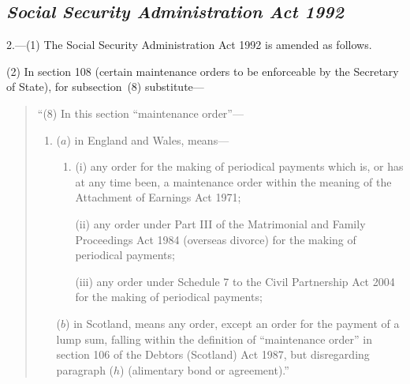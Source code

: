 \documentclass[12pt,a4paper]{article}
\begin{document}
\subsection*{\itshape Social Security Administration Act 1992}

2.---(1) The Social Security Administration Act 1992 is amended as follows.

(2) In section 108 (certain maintenance orders to be enforceable by the Secretary of State), for subsection~(8) substitute—
\begin{quotation}
“(8) In this section “maintenance order”—
\begin{enumerate}\item[]
($a$) in England and Wales, means—
\begin{enumerate}\item[]
(i) any order for the making of periodical payments which is, or has at any time been, a maintenance order within the meaning of the Attachment of Earnings Act 1971;

(ii) any order under Part III of the Matrimonial and Family Proceedings Act 1984 (overseas divorce) for the making of periodical payments;

(iii) any order under Schedule 7 to the Civil Partnership Act 2004 for the making of periodical payments;
\end{enumerate}

($b$) in Scotland, means any order, except an order for the payment of a lump sum, falling within the definition of “maintenance order” in section 106 of the Debtors (Scotland) Act 1987, but disregarding paragraph ($h$) (alimentary bond or agreement).”
\end{enumerate}
\end{quotation}
\end{document}
